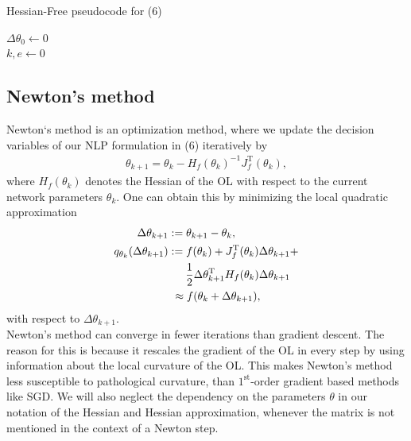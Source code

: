 \documentclass[conference]{IEEEtran}
\begin{document}
	\begin{algorithm}
		\caption{Hessian-Free pseudocode for (6)}\label{alg:two}
		$\Delta\theta_{0}\gets 0$\\
		$k, e\gets 0$\\
		\KwOut{$\theta^{\star}$}
	\end{algorithm}
	\subsection{Newton's method}
	\noindent
	Newton`s method is an optimization method, where we update the decision variables of our NLP formulation in (6) iteratively by
	\begin{align}
	\theta_{k+1} = \theta_{k} -H_{f}(\theta_{k})^{-1} J_{f}^{\mathrm{T}}(\theta_{k}),
	\end{align}
	where $H_{f}(\theta_{k})$ denotes the Hessian of the OL with respect to the current network parameters $\theta_{k}$. One can obtain this by minimizing the local quadratic approximation
	\begin{align}
	\text{ }\Delta\theta_{k+1} &:= \theta_{k+1} - \theta_{k},\\
	q_{\theta_{k}}(\Delta\theta_{k+1})&:= f(\theta_{k}) + J_{f}^{\mathrm{T}}(\theta_{k})\Delta\theta_{k+1} + \notag\\
	&\:\:\:\:\:\:\:\frac{1}{2}\Delta\theta_{k+1}^{\mathrm{T}}H_{f}(\theta_{k})\Delta\theta_{k+1}\\
	&\text{ }\approx f(\theta_{k} + \Delta\theta_{k+1}),
	\end{align}
	with respect to $\Delta\theta_{k+1}$. \\
	Newton's method can converge in fewer iterations than gradient descent. The reason for this is because it rescales the gradient of the OL in every step by using information about the local curvature of the OL. This makes Newton's method less susceptible to pathological curvature, than $1^{\text{st}}$-order gradient based methods like SGD. We will also neglect the dependency on the parameters $\theta$ in our notation of the Hessian and Hessian approximation, whenever the matrix is not mentioned in the context of a Newton step.
	
\end{document}
